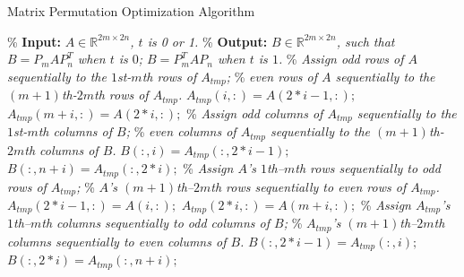 \documentclass[12pt]{article}
\begin{document}
\begin{algorithm}[htbp]
    \caption{Matrix Permutation Optimization Algorithm}
    \label{alg:Permutation Optimization}
    \begin{algorithmic}[1]
        \State \% \textbf{Input:} \textit{$ A\in \mathbb{R}^{2m\times 2n}$, $t$ is 0 or 1.}
        \State \% \textbf{Output:} \textit{$B \in\mathbb{R}^{2m\times 2n}$, such that $B=P_mAP_n^T$ when $t$ is $0$;  $B=P_m^TAP_n$ when $t$ is $1$.}
        \State
            \State \% \textit{Assign odd rows of $A$ sequentially to the $1$st-$m$th rows of $A_{tmp}$; }
            \State \% \textit{even rows of $A$ sequentially to the $(m+1)$th-$2m$th rows of $A_{tmp}$.}
                \State $A_{tmp}(i, :) = A(2*i-1, :);$
                \State $A_{tmp}(m+i, :) = A(2*i, :);$
            \End
            \State \% \textit{Assign odd columns of $A_{tmp}$ sequentially to the $1$st-$m$th columns of $B$; }
            \State \% \textit{even columns of $A_{tmp}$ sequentially to the $(m+1)$th-$2m$th columns of $B$.}
                \State $B(:, i) = A_{tmp}(:, 2*i-1);$
                \State $B(:, n+i) = A_{tmp}(:, 2*i);$
            \End
        \Else  
            \State \% \textit{Assign $A$'s $1$th--$m$th rows sequentially to odd rows of $A_{tmp}$;}
            \State \% \textit{$A$'s $(m+1)$th--$2m$th rows sequentially to even rows of $A_{tmp}$.}
                \State $A_{tmp}(2*i-1, :) = A(i, :);$
                \State $A_{tmp}(2*i, :) = A(m+i, :);$
            \End
            \State \% \textit{Assign $A_{tmp}$'s $1$th--$m$th columns sequentially to odd columns of $B$;}
            \State \% \textit{$A_{tmp}$'s $(m+1)$th--$2m$th columns sequentially to even columns of $B$.}
                \State $B(:, 2*i-1) = A_{tmp}(:, i);$
                \State $B(:, 2*i) = A_{tmp}(:, n+i);$
            \End
        \End
    \End 
    \end{algorithmic}
\end{algorithm}
\end{document}
